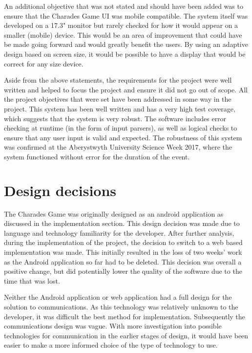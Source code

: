 An additional objective that was not stated and should have been added was to ensure that the Charades Game UI was mobile compatible. The system itself was developed on a 17.3" monitor but rarely checked for how it would appear on a smaller (mobile) device. This would be an area of improvement that could have be made going forward and would greatly benefit the users. By using an adaptive design based on screen size, it would be possible to have a display that would be correct for any size device.

Aside from the above statements, the requirements for the project were well written and helped to focus the project and ensure it did not go out of scope. All the project objectives that were set have been addressed in some way in the project. This system has been well written and has a very high test coverage, which suggests that the system is very robust. The software includes error checking at runtime (in the form of input parsers), as well as logical checks to ensure that any user input is valid and expected. The robustness of this system was confirmed at the Aberystwyth University Science Week 2017, where the system functioned without error for the duration of the event.


\section{Design decisions}

The Charades Game was originally designed as an android application as discussed in the implementation section. This design decision was made due to language and technology familiarity for the developer. After further analysis, during the implementation of the project, the decision to switch to a web based implementation was made. This initially resulted in the loss of two weeks' work as the Android application so far had to be deleted. This decision was overall a positive change, but did potentially lower the quality of the software due to the time that was lost.

Neither the Android application or web application had a full design for the solution to communications. As this technology was relatively unknown to the developer, it was difficult the best method for implementation. Subsequently the communications design was vague. With more investigation into possible technologies for communication in the earlier stages of design, it would have been easier to make a more informed choice of the type of technology to use.

